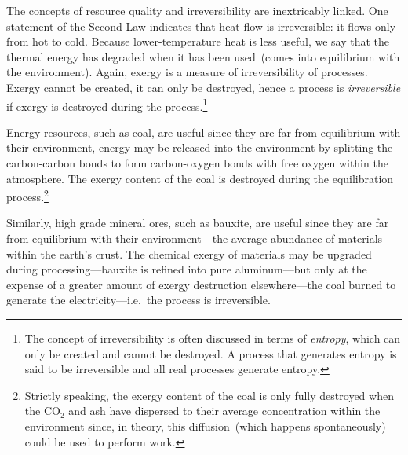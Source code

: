 The concepts of resource quality and irreversibility are inextricably linked.
One statement of the Second Law indicates that heat flow is irreversible: 
it flows only from hot to cold. 
Because lower-temperature heat is less useful, 
we say that the thermal energy has 
degraded when it has been used~(comes 
into equilibrium with the environment).
Again,
exergy is a measure of irreversibility of processes.
Exergy cannot be created, it can only be destroyed,
hence a process is \emph{irreversible}
if exergy is destroyed during the process.\footnote{The concept of
irreversibility is often discussed in terms of \emph{entropy},
which can only be created and cannot be destroyed.
A process that generates entropy is said to be irreversible
and all real processes generate entropy.}



Energy resources, such as coal, are useful
since they are far from equilibrium with their environment,
energy may be released into the environment by
splitting the carbon-carbon bonds to form 
carbon-oxygen bonds with free oxygen 
within the atmosphere.
The exergy content of the coal is destroyed during
the equilibration process.\footnote{Strictly speaking,
the exergy content of the coal is only fully destroyed
when the CO$_2$ and ash have dispersed to their average
concentration within the environment since,
in theory,
this diffusion~(which happens spontaneously) 
could be used to perform work.}

Similarly, high grade mineral ores, such as bauxite, 
are useful since they are far from equilibrium with their
environment---the average abundance of materials
within the earth's crust.
The chemical exergy of materials may be upgraded
during processing---bauxite is refined into pure 
aluminum---but only at the expense of a greater
amount of exergy destruction elsewhere---the coal
burned to generate the electricity---i.e.\ the process is irreversible.

